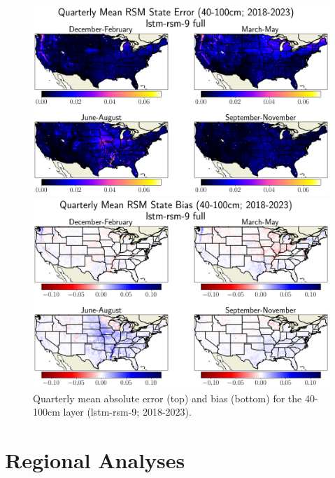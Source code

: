 \begin{figure}[hp!]
    \centering

    \includegraphics[width=.99\linewidth,draft=false]{figures/grid-eval_qtrly/eval-grid_full_lstm-rsm-9_pixelwise-time-stats_abs-err_qtrly-err-state-rsm-100.png}


    \includegraphics[width=.99\linewidth,draft=false]{figures/grid-eval_qtrly/eval-grid_full_lstm-rsm-9_pixelwise-time-stats_bias_qtrly-err-state-rsm-100.png}

    \caption{Quarterly mean absolute error (top) and bias (bottom) for the 40-100cm layer (lstm-rsm-9; 2018-2023).}
    \label{bulk-eval_qtrly_rsm-100}
\end{figure}

\section{Regional Analyses}

